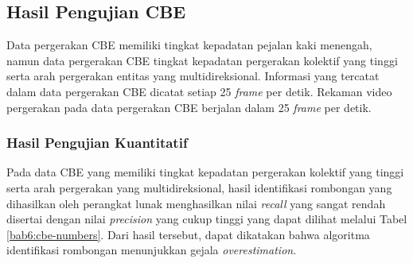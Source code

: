 \subsection{Hasil Pengujian CBE}
\label{subsec:cbe-result}

Data pergerakan CBE memiliki tingkat kepadatan pejalan kaki menengah, namun data pergerakan CBE tingkat kepadatan pergerakan kolektif yang tinggi serta arah pergerakan entitas yang multidireksional. Informasi yang tercatat dalam data pergerakan CBE dicatat setiap 25 \textit{frame} per detik. Rekaman video pergerakan pada data pergerakan CBE berjalan dalam 25 \textit{frame} per detik.

\subsubsection{Hasil Pengujian Kuantitatif}
\label{subsubsec:cbe-quantitative}

Pada data CBE yang memiliki tingkat kepadatan pergerakan kolektif yang tinggi serta arah pergerakan yang multidireksional, hasil identifikasi rombongan yang dihasilkan oleh perangkat lunak menghasilkan nilai \textit{recall} yang sangat rendah disertai dengan nilai \textit{precision} yang cukup tinggi yang dapat dilihat melalui Tabel \ref{bab6:cbe-numbers}. Dari hasil tersebut, dapat dikatakan bahwa algoritma identifikasi rombongan menunjukkan gejala \textit{overestimation}.

